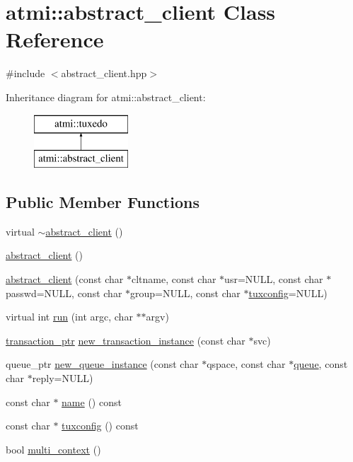 \hypertarget{classatmi_1_1abstract__client}{}\section{atmi\+:\+:abstract\+\_\+client Class Reference}
\label{classatmi_1_1abstract__client}


{\ttfamily \#include $<$abstract\+\_\+client.\+hpp$>$}

Inheritance diagram for atmi\+:\+:abstract\+\_\+client\+:\begin{figure}[H]
\begin{center}
\leavevmode
\includegraphics[height=2.000000cm]{classatmi_1_1abstract__client}
\end{center}
\end{figure}
\subsection*{Public Member Functions}
\begin{DoxyCompactItemize}
\item 
virtual \hyperlink{classatmi_1_1abstract__client_a789a662f195c11cd9d9b6d091caa0874}{$\sim$abstract\+\_\+client} ()
\item 
\hyperlink{classatmi_1_1abstract__client_a10a6aa2b44cb98ceab7d4e637757437e}{abstract\+\_\+client} ()
\item 
\hyperlink{classatmi_1_1abstract__client_a67d65b7ec70b83b7fc55260256ac4fd0}{abstract\+\_\+client} (const char $\ast$cltname, const char $\ast$usr=N\+U\+LL, const char $\ast$passwd=N\+U\+LL, const char $\ast$group=N\+U\+LL, const char $\ast$\hyperlink{classatmi_1_1abstract__client_af2a6efcd7a45c09251cb129d04d7aa85}{tuxconfig}=N\+U\+LL)
\item 
virtual int \hyperlink{classatmi_1_1abstract__client_a090bac30edb1055da2a0c980167bfe19}{run} (int argc, char $\ast$$\ast$argv)
\item 
\hyperlink{group__atmi_gab8e359f2305eaf285b0b0745d3b41997}{transaction\+\_\+ptr} \hyperlink{classatmi_1_1abstract__client_a9449f2df2136afd5b253389418265c87}{new\+\_\+transaction\+\_\+instance} (const char $\ast$svc)
\item 
queue\+\_\+ptr \hyperlink{classatmi_1_1abstract__client_a7337c966369376497d9c1f94ec12c5ae}{new\+\_\+queue\+\_\+instance} (const char $\ast$qspace, const char $\ast$\hyperlink{classatmi_1_1queue}{queue}, const char $\ast$reply=N\+U\+LL)
\item 
const char $\ast$ \hyperlink{classatmi_1_1abstract__client_a2f50ed746c5bab5e01ef0677296e10e3}{name} () const 
\item 
const char $\ast$ \hyperlink{classatmi_1_1abstract__client_af2a6efcd7a45c09251cb129d04d7aa85}{tuxconfig} () const 
\item 
bool \hyperlink{classatmi_1_1abstract__client_a026c8cff81a66afdcfa3bf977417738a}{multi\+\_\+context} ()
\end{DoxyCompactItemize}
